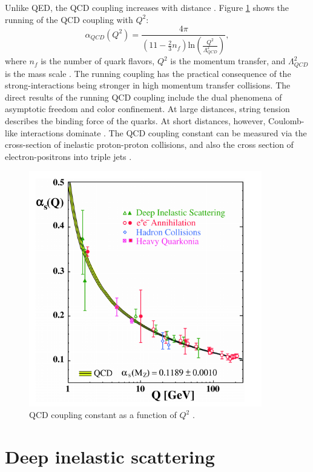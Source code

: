 Unlike QED, the QCD coupling increases with distance \cite{Bethke:2006ac}. Figure \ref{fig:runningQCDCoupling} shows the running of the QCD coupling with $Q^2$:
\begin{equation}
\alpha_{QCD}(Q^2) = \frac{4 \pi }{(11 - \frac{2}{3}n_f)\mathrm{ln}(\frac{Q^2}{\Lambda^2_{QCD}}) } ,
\end{equation}
where $n_f$ is the number of quark flavors, $Q^2$ is the momentum transfer, and  $\Lambda^2_{QCD}$ is the mass scale \cite{Deur:2016tte}. The running coupling has the practical consequence of the strong-interactions being stronger in high momentum transfer collisions. The direct results of the running QCD coupling include the dual phenomena of asymptotic freedom and color confinement. At large distances, string tension describes the binding force of the quarks. At short distances, however, Coulomb-like interactions dominate \cite{Bjorken:1968dy}. The QCD coupling constant can be measured via the cross-section of inelastic proton-proton collisions, and also the cross section of electron-positrons into triple jets \cite{Thomson:2013zua}. 
\begin{figure}[h!]
\begin{centering}
\includegraphics[width=4in]{Chapter1/importfigs/qcd_coupling_bethke.png}
\par\end{centering}
\caption{QCD coupling constant as a function of $Q^2$ \cite{Bethke:2006ac}. \label{fig:runningQCDCoupling}}
\end{figure}

\section{Deep inelastic scattering}

